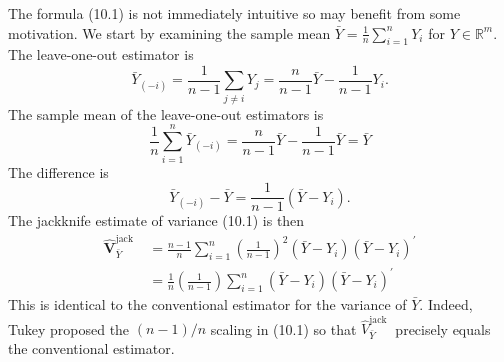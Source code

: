 \documentclass[10pt]{article}
\begin{document}
The formula (10.1) is not immediately intuitive so may benefit from some motivation. We start by examining the sample mean $\bar{Y}=\frac{1}{n} \sum_{i=1}^{n} Y_{i}$ for $Y \in \mathbb{R}^{m}$. The leave-one-out estimator is
$$
\bar{Y}_{(-i)}=\frac{1}{n-1} \sum_{j \neq i} Y_{j}=\frac{n}{n-1} \bar{Y}-\frac{1}{n-1} Y_{i} .
$$
The sample mean of the leave-one-out estimators is
$$
\frac{1}{n} \sum_{i=1}^{n} \bar{Y}_{(-i)}=\frac{n}{n-1} \bar{Y}-\frac{1}{n-1} \bar{Y}=\bar{Y}
$$
The difference is
$$
\bar{Y}_{(-i)}-\bar{Y}=\frac{1}{n-1}\left(\bar{Y}-Y_{i}\right) .
$$
The jackknife estimate of variance (10.1) is then
$$
\begin{aligned}
\widehat{\boldsymbol{V}}_{\bar{Y}}^{\text {jack }} &=\frac{n-1}{n} \sum_{i=1}^{n}\left(\frac{1}{n-1}\right)^{2}\left(\bar{Y}-Y_{i}\right)\left(\bar{Y}-Y_{i}\right)^{\prime} \\
&=\frac{1}{n}\left(\frac{1}{n-1}\right) \sum_{i=1}^{n}\left(\bar{Y}-Y_{i}\right)\left(\bar{Y}-Y_{i}\right)^{\prime}
\end{aligned}
$$
This is identical to the conventional estimator for the variance of $\bar{Y}$. Indeed, Tukey proposed the $(n-1) / n$ scaling in (10.1) so that $\widehat{V}_{\bar{Y}}^{\text {jack }}$ precisely equals the conventional estimator.
\end{document}
